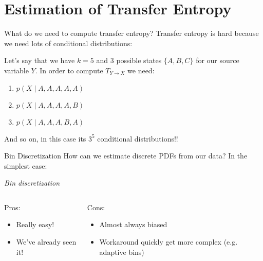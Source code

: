 \documentclass{cubeamer}
\begin{document}
\section{Estimation of Transfer Entropy}

\begin{frame}{What do we need to compute transfer entropy?}
\centering
  Transfer entropy is hard because we need lots of conditional distributions:
    
    Let's say that we have $k=5$ and 3 possible states $\{A, B, C\}$ for our source variable $Y$. In order to compute $T_{Y \rightarrow X}$ we need:
    
    \begin{enumerate}
        \item $p(X \mid A, A, A, A, A)$
        \item $p(X \mid A, A, A, A, B)$
        \item $p(X \mid A, A, A, B, A)$
    \end{enumerate}
    
    And so on, in this case its $3^5$ conditional distributions!!
\end{frame}

\begin{frame}{Bin Discretization}
\centering
    How can we estimate discrete PDFs from our data? In the simplest case:
    
    \textit{Bin discretization}
    
    \vspace{15}
    \begin{columns}
        \begin{column}{0.5\textwidth}
            Pros:
            \begin{itemize}
                \item Really easy!
                \item We've already seen it!
            \end{itemize}
        \end{column}
        \begin{column}{0.5\textwidth}
            Cons:
            \begin{itemize}
                \item Almost always biased
                \item Workaround quickly get more complex (e.g. adaptive bins)
            \end{itemize}
        \end{column}
    \end{columns}
\end{frame}
\end{document}
